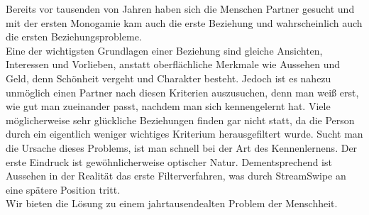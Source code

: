 
Bereits vor tausenden von Jahren haben sich die Menschen Partner gesucht und mit der ersten Monogamie kam auch die erste Beziehung und wahrscheinlich auch die ersten Beziehungsprobleme.\\
Eine der wichtigsten Grundlagen einer Beziehung sind gleiche Ansichten, Interessen und Vorlieben, anstatt oberflächliche Merkmale wie Aussehen und Geld, denn Schönheit vergeht und Charakter besteht. Jedoch ist es nahezu unmöglich einen Partner nach diesen Kriterien  auszusuchen, denn man weiß erst, wie gut man zueinander passt, nachdem man sich kennengelernt hat. Viele möglicherweise sehr glückliche Beziehungen finden gar nicht statt, da die Person durch ein eigentlich weniger wichtiges Kriterium herausgefiltert wurde. Sucht man die Ursache dieses Problems, ist man schnell bei der Art des Kennenlernens. Der erste Eindruck ist gewöhnlicherweise optischer Natur. Dementsprechend ist Aussehen in der Realität das erste Filterverfahren, was durch StreamSwipe an eine spätere  Position tritt.\\
Wir bieten die Lösung zu einem jahrtausendealten Problem der Menschheit.


